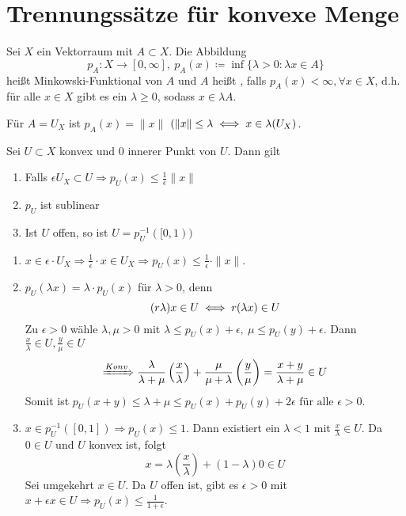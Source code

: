 

\section{Trennungssätze für konvexe Menge}


\begin{definition}
	Sei $X$ ein Vektorraum mit $A \subset X$. Die Abbildung 
		\[ p_{A} \colon X \rightarrow [0, \infty], ~ p_{A}(x) \coloneqq \inf \{ \lambda > 0 : \lambda x \in A \} \]
		hei{\ss}t Minkowski-Funktional von $A$ und $A$ hei{\ss}t , falls $p_{A}(x) < \infty, \forall x \in X$, d.h. für alle $ x \in X$ gibt es ein $\lambda \geq 0$, sodass $x \in \lambda A$.
\end{definition}


\begin{beispiel}
	Für $A = U_{X}$ ist $p_{A}(x) = \| x \|$ $( \| x \| \leq \lambda \iff x \in \lambda (U_{X})$.	
\end{beispiel}


\begin{prop}
	Sei $U \subset X$ konvex und $0$ innerer Punkt von $U$. Dann gilt
	\begin{enumerate}[label=\alph*\upshape)]
		\item Falls $\epsilon U_{X} \subset U \Rightarrow p_{U}(x) \leq \frac{1}{\epsilon} \| x \|$
		\item $p_{U}$ ist sublinear
		\item Ist $U$ offen, so ist $U = p_{U}^{-1}([0 , 1))$
	\end{enumerate}	
\end{prop}

\begin{beweis}
	\begin{enumerate}[label=\alph*\upshape)]
		\item $x \in \epsilon \cdot U_{X} \Rightarrow \frac{1}{\epsilon} \cdot x \in U_{X} \Rightarrow p_{U}(x) \leq \frac{1}{\epsilon} \cdot \| x \|$.
		\item $p_{U}(\lambda x ) = \lambda \cdot p_{U}(x)$ für $\lambda > 0$, denn 
			\[ (r \lambda) x \in U \iff r(\lambda x) \in U \] 
			Zu $\epsilon > 0$ wähle $\lambda, \mu > 0$ mit  $\lambda \leq p_{U}(x) + \epsilon, ~\mu \leq p_{U}(y) + \epsilon$. Dann $\frac{x}{\lambda} \in U, \frac{y}{\mu} \in U$ 
			\[ \xRightarrow[]{Konv} \frac{\lambda}{\lambda + \mu} \left( \frac{x}{\lambda} \right) + \frac{\mu}{\mu + \lambda} \left( \frac{y}{\mu} \right) = \frac{x + y}{\lambda + \mu} \in U \]
			Somit ist $p_{U}(x + y) \leq \lambda + \mu \leq p_{U}(x) + p_{U}(y) + 2 \epsilon \text{ für alle } \epsilon > 0$.
		\item $x \in p_{U}^{-1}([0, 1]) \Rightarrow p_{U}(x) \leq 1$. Dann existiert ein $\lambda < 1$ mit $\frac{x}{\lambda} \in U$. Da $0 \in U$ und $U$ konvex ist, folgt
			\[ x = \lambda \left( \frac{x}{\lambda} \right) + (1 - \lambda) 0 \in U \]
			Sei umgekehrt $x \in U$. Da $U$ offen ist, gibt es $\epsilon > 0$ mit $x + \epsilon x \in U \Rightarrow p_{U}(x) \leq \frac{1}{1 + \epsilon}$.
	\end{enumerate}
\end{beweis}



